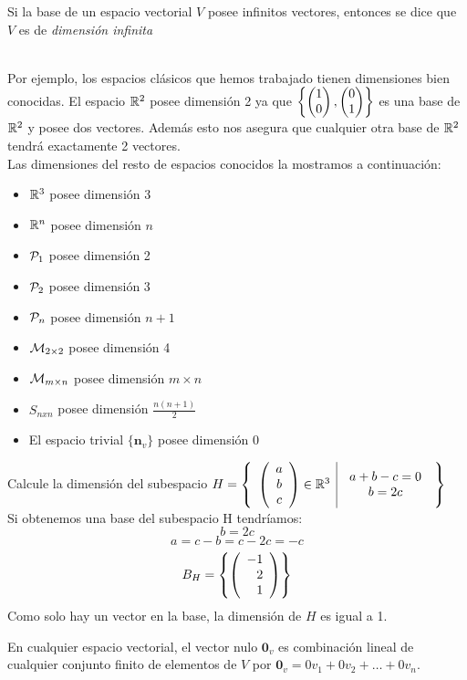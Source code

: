 Si la base de un espacio vectorial $V$ posee infinitos vectores, entonces se dice que $V$ es de  \textit{dimensión infinita} 

~\\
Por ejemplo, los espacios clásicos que hemos trabajado tienen dimensiones bien conocidas. El espacio $\mathbb{R}^2 $ posee dimensión 2 ya que $ \left\{\begin{pmatrix} 1\\ 0\\ \end{pmatrix} , \begin{pmatrix} 0\\ 1\\ \end{pmatrix}  \right\} $ es una base de $\mathbb{R}^2$ y posee dos vectores. Además esto nos asegura que cualquier otra base de $ \mathbb{R}^2$ tendrá exactamente 2 vectores.
~\\

Las dimensiones del resto de espacios conocidos la mostramos a continuación:

\begin{itemize}
\item $\mathbb{R}^3 $ posee dimensión 3
\item $\mathbb{R}^n$ posee dimensión $n$
\item $\mathcal{P}_1$ posee dimensión 2
\item $\mathcal{P}_2$ posee dimensión 3
\item $\mathcal{P}_n$ posee dimensión $n+1$
\item $\mathcal{M}_{2\times 2}$ posee  dimensión 4
\item $\mathcal{M}_{m\times n}$ posee  dimensión $m\times n$ 
\item $S_{nxn}$ posee  dimensión $\frac{n(n+1)}{2}$ 
\item El espacio trivial $\{\mathbf{n}_v\}$ posee dimensión 0

\end{itemize}
\begin{ejemplo}
Calcule la dimensión del subespacio $H= \left\{\begin{array}{c|c} {\left( \begin{array}{c} a\\ b\\ c \end{array}\right) \in \mathbb{R}^3 }&{\begin{array}{c}
a+b-c=0\\
b=2c
\end{array}} \end{array} \right\}$
~\\
\sol
Si obtenemos una base del subespacio H tendríamos:
\[b=2c\]
\[ a=c-b=c-2c=-c\]
\[B_H= \left\{\left( \begin{array}{r} -1\\ 2\\ 1 \end{array} \right)  \right\} \]
Como solo hay un vector en la base, la dimensión de $H$ es igual a 1.

\end{ejemplo}

\begin{obsimp}
En cualquier espacio vectorial, el vector nulo $\mathbf{0}_v$ es combinación lineal de cualquier conjunto finito de elementos de $V$  por $\mathbf{0}_v = 0 v_1 + 0 v_2 + \ldots + 0 v_n$.\\
\end{obsimp}

